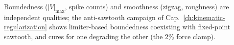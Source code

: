 \begin{remark}
Boundedness ($|V|_{\max}$, spike counts) and smoothness (zigzag,
roughness) are independent qualities; the anti-sawtooth campaign of
Cap.~\ref{ch:kinematic-regularization} shows limiter-based
boundedness coexisting with fixed-point sawtooth, and cures for one
degrading the other (the 2\% force clamp).
\end{remark}

